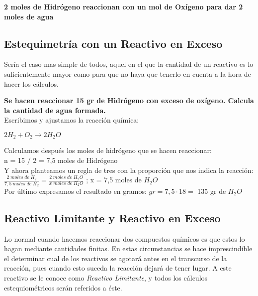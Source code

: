\begin{center}
\textbf{2 moles de Hidrógeno reaccionan con un mol de Oxígeno para dar 2 moles de agua}
\end{center}

\subsection{Estequimetría con un Reactivo en Exceso}

Sería el caso mas simple de todos, aquel en el que la cantidad de un reactivo es lo suficientemente mayor como para que no haya que tenerlo en cuenta a la hora de hacer los cálculos.\\

\begin{exercise}
	\textbf{Se hacen reaccionar 15 gr de Hidrógeno con exceso de oxígeno. Calcula la cantidad de agua formada.}\\
	
	Escribimos y ajustamos la reacción química:\\
	
	\begin{center}
		$2H_2 + O_2 \longrightarrow 2H_2O$
	\end{center}
	
	Calculamos después los moles de hidrógeno que se hacen reaccionar:\\
	
	n = 15 / 2 = 7,5 moles de Hidrógeno\\
	
	Y ahora planteamos un regla de tres con la proporción que nos indica la reacción:\\
	
	$\frac{2\; moles\; de\; H_2}{7,5\: moles\; de\; H_2}=\frac{2 \; moles\; de\; H_2O}{x \; moles\; de\; H_2O}$ ; x = 7,5 moles de $H_2O$\\
	
	Por último expresamos el resultado en gramos:  $gr = 7,5 \cdot 18 =$ 135 gr de $H_2O$
\end{exercise}

\subsection{Reactivo Limitante y Reactivo en Exceso}

Lo normal cuando hacemos reaccionar dos compuestos químicos es que estos lo hagan mediante cantidades finitas. En estas circunstancias se hace imprescindible el determinar cual de los reactivos se agotará antes en el transcurso de la reacción, pues cuando esto suceda la reacción dejará de tener lugar. A este reactivo se le conoce como \emph{Reactivo Limitante}, y todos los cálculos estequiométricos serán referidos a éste.\\

